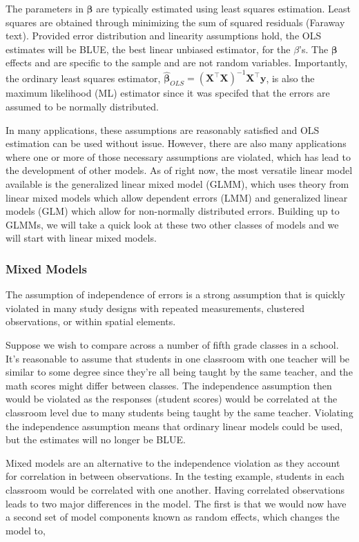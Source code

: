 \documentclass{article}\usepackage[]{graphicx}\usepackage[]{color}
\newcommand{\T}{{\intercal}}
\newcommand{\mb}[1]{$\bm{#1}$}
\begin{document}
The parameters in \mb{\beta} are typically estimated using least squares estimation. Least squares are obtained through minimizing the sum of squared residuals (Faraway text). Provided error distribution and linearity assumptions hold, the OLS estimates will be BLUE, the best linear unbiased estimator, for the $\beta$'s. The \mb{\beta} effects and are specific to the sample and are not random variables. Importantly, the ordinary least squares estimator, $\hat{\bm{\beta}}_{OLS} = (\bm{X}^{\T}\bm{X})^{-1}\bm{X}^{\T}\bm{y}$, is also the maximum likelihood (ML) estimator since it was specifed that the errors are assumed to be normally distributed.

In many applications, these assumptions are reasonably satisfied and OLS estimation can be used without issue. However, there are also many applications where one or more of those necessary assumptions are violated, which has lead to the development of other models. As of right now, the most versatile linear model available is the generalized linear mixed model (GLMM), which uses theory from linear mixed models which allow dependent errors (LMM) and generalized linear models (GLM) which allow for non-normally distributed errors. Building up to GLMMs, we will take a quick look at these two other classes of models and we will start with linear mixed models. 

\subsubsection{Mixed Models}
  
The assumption of independence of errors is a strong assumption that is quickly violated in many study designs with repeated measurements, clustered observations, or within spatial elements. 

Suppose we wish to compare  across a number of fifth grade classes in a school. It's reasonable to assume that students in one classroom with one teacher will be similar to some degree since they're all being taught by the same teacher, and the math scores might differ between classes. The independence assumption then would be violated as the responses (student scores) would be correlated at the classroom level due to many students being taught by the same teacher. Violating the independence assumption means that ordinary linear models could be used, but the estimates will no longer be BLUE.

Mixed models are an alternative to the independence violation as they account for correlation in between observations. In the testing example, students in each classroom would be correlated with one another. Having correlated observations leads to two major differences in the model. The first is that we would now have a second set of model components known as random effects, which changes the model to,
\end{document}
